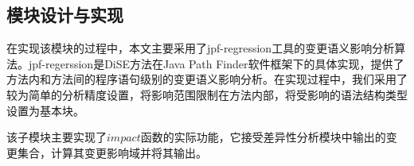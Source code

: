 %
%

\subsection{模块设计与实现}

在实现该模块的过程中，本文主要采用了jpf-regression工具的变更语义影响分析算法。jpf-regerssion是DiSE方法在Java Path Finder软件框架下的具体实现，提供了方法内和方法间的程序语句级别的变更语义影响分析。在实现过程中，我们采用了较为简单的分析精度设置，将影响范围限制在方法内部，将受影响的语法结构类型设置为基本块。

该子模块主要实现了$impact$函数的实际功能，它接受差异性分析模块中输出的变更集合，计算其变更影响域并将其输出。


